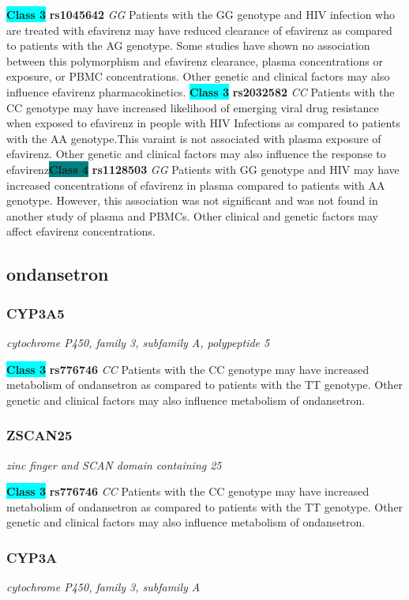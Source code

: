 \documentclass{report}
\begin{document}
\textbf{\colorbox{cyan} {Class 3}} \textbf{ rs1045642 } \textit{ GG }
Patients with the GG genotype and HIV infection who are treated with efavirenz may have reduced clearance of efavirenz as compared to patients with the AG genotype. Some studies have shown no association between this polymorphism and efavirenz clearance, plasma concentrations or exposure, or PBMC concentrations. Other genetic and clinical factors may also influence efavirenz pharmacokinetics. \newline\textbf{\colorbox{cyan} {Class 3}} \textbf{ rs2032582 } \textit{ CC }
Patients with the CC genotype may have increased likelihood of emerging viral drug resistance when exposed to efavirenz in people with HIV Infections as compared to patients with the AA genotype.This varaint is not associated with plasma exposure of efavirenz. Other genetic and clinical factors may also influence the response to efavirenz\newline\textbf{\colorbox{teal} {Class 4}} \textbf{ rs1128503 } \textit{ GG }
Patients with GG genotype and HIV may have increased concentrations of efavirenz in plasma compared to patients with AA genotype. However, this association was not significant and was not found in another study of plasma and PBMCs.  Other clinical and genetic factors may affect efavirenz concentrations.\newline\subsection{ ondansetron }\subsubsection{ CYP3A5 }
\textit{ cytochrome P450, family 3, subfamily A, polypeptide 5 }

\textbf{\colorbox{cyan} {Class 3}} \textbf{ rs776746 } \textit{ CC }
Patients with the CC genotype may have increased metabolism of ondansetron as compared to patients with the TT genotype. Other genetic and clinical factors may also influence metabolism of ondansetron.\newline\subsubsection{ ZSCAN25 }
\textit{ zinc finger and SCAN domain containing 25 }

\textbf{\colorbox{cyan} {Class 3}} \textbf{ rs776746 } \textit{ CC }
Patients with the CC genotype may have increased metabolism of ondansetron as compared to patients with the TT genotype. Other genetic and clinical factors may also influence metabolism of ondansetron.\newline\subsubsection{ CYP3A }
\textit{ cytochrome P450, family 3, subfamily A }
\end{document}
